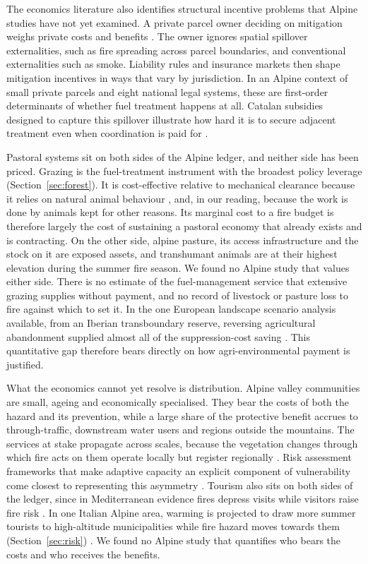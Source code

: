 \documentclass[11pt,a4paper]{article}
\begin{document}
The economics literature also identifies structural incentive problems that Alpine studies have not yet examined. A private parcel owner deciding on mitigation weighs private costs and benefits \citep{bayham_economics_2022}. The owner ignores spatial spillover externalities, such as fire spreading across parcel boundaries, and conventional externalities such as smoke. Liability rules and insurance markets then shape mitigation incentives in ways that vary by jurisdiction. In an Alpine context of small private parcels and eight national legal systems, these are first-order determinants of whether fuel treatment happens at all. Catalan subsidies designed to capture this spillover illustrate how hard it is to secure adjacent treatment even when coordination is paid for \citep{gorrizmifsud_current_2026}.

Pastoral systems sit on both sides of the Alpine ledger, and neither side has been priced. Grazing is the fuel-treatment instrument with the broadest policy leverage (Section~\ref{sec:forest}). It is cost-effective relative to mechanical clearance because it relies on natural animal behaviour \citep{xu_how_2026}, and, in our reading, because the work is done by animals kept for other reasons. Its marginal cost to a fire budget is therefore largely the cost of sustaining a pastoral economy that already exists and is contracting. On the other side, alpine pasture, its access infrastructure and the stock on it are exposed assets, and transhumant animals are at their highest elevation during the summer fire season. We found no Alpine study that values either side. There is no estimate of the fuel-management service that extensive grazing supplies without payment, and no record of livestock or pasture loss to fire against which to set it. In the one European landscape scenario analysis available, from an Iberian transboundary reserve, reversing agricultural abandonment supplied almost all of the suppression-cost saving \citep{lecinadiaz_incorporating_2023}. This quantitative gap therefore bears directly on how agri-environmental payment is justified.

What the economics cannot yet resolve is distribution. Alpine valley communities are small, ageing and economically specialised. They bear the costs of both the hazard and its prevention, while a large share of the protective benefit accrues to through-traffic, downstream water users and regions outside the mountains. The services at stake propagate across scales, because the vegetation changes through which fire acts on them operate locally but register regionally \citep{vukomanovic_systematic_2019}. Risk assessment frameworks that make adaptive capacity an explicit component of vulnerability come closest to representing this asymmetry \citep{riviere_mapping_2023, lecinadiaz_assessing_2021}. Tourism also sits on both sides of the ledger, since in Mediterranean evidence fires depress visits while visitors raise fire risk \citep{abrham_wildfires_2024}. In one Italian Alpine area, warming is projected to draw more summer tourists to high-altitude municipalities while fire hazard moves towards them (Section~\ref{sec:risk}) \citep{pede_mountain_2022}. We found no Alpine study that quantifies who bears the costs and who receives the benefits.
\end{document}
